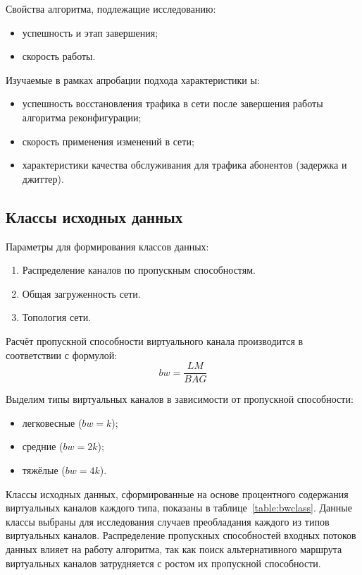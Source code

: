 \documentclass[12pt,fleqn]{article}
\begin{document}
Свойства алгоритма, подлежащие исследованию:
\begin{itemize}
	\item успешность и этап завершения;
	\item скорость работы.
\end{itemize}

Изучаемые в рамках апробации подхода характеристики ы:
\begin{itemize}
	\item успешность восстановления трафика в сети после завершения работы алгоритма реконфигурации;
	\item скорость применения изменений в сети;
	\item характеристики качества обслуживания для трафика абонентов (задержка и джиттер).
\end{itemize}

\subsection{Классы исходных данных}
Параметры для формирования классов данных:
\begin{enumerate}
	\item Распределение каналов по пропускным способностям.
	\item Общая загруженность сети.
	\item Топология сети.
\end{enumerate}

Расчёт пропускной способности виртуального канала производится в соответствии с формулой:
$$bw = \frac{LM}{BAG}$$

Выделим типы виртуальных каналов в зависимости от пропускной способности:
\begin{itemize}
	\item легковесные ($bw=k$);
	\item средние ($bw=2k$);
	\item тяжёлые ($bw=4k$).
\end{itemize}

Классы исходных данных, сформированные на основе процентного содержания виртуальных каналов каждого типа, показаны в таблице~\ref{table:bwclass}. Данные классы выбраны для исследования случаев преобладания каждого из типов виртуальных каналов. Распределение пропускных способностей входных потоков данных влияет на работу алгоритма, так как поиск альтернативного маршрута виртуальных каналов затрудняется с ростом их пропускной способности.
\end{document}
